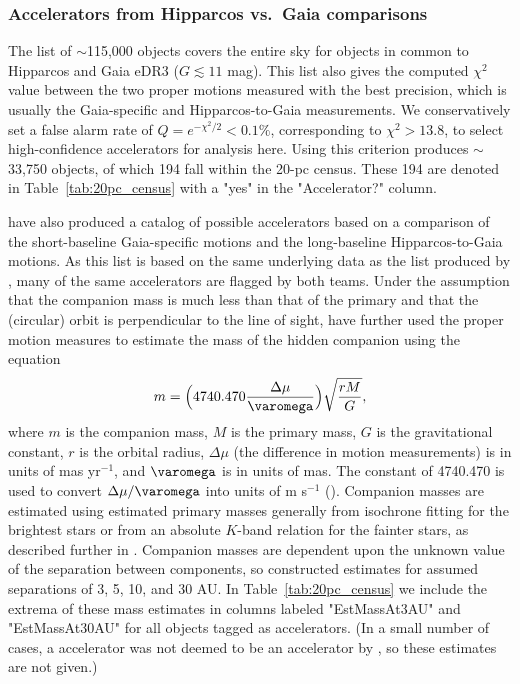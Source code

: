 \documentclass[twocolumn,tighten,twocolappendix]{aastex631}
\begin{document}
\subsubsection{Accelerators from Hipparcos vs.\ Gaia comparisons}

The \cite{brandt2021} list of $\sim$115,000 objects covers the entire sky for objects in common to Hipparcos and Gaia eDR3 ($G \lesssim 11$ mag). This list also gives the computed $\chi^2$ value between the two proper motions measured with the best precision, which is usually the Gaia-specific and Hipparcos-to-Gaia measurements. We conservatively set a false alarm rate of $Q = e^{-\chi^2/2} < 0.1\%$, corresponding to $\chi^2 > 13.8$, to select high-confidence accelerators for analysis here. Using this criterion produces $\sim$33,750 objects, of which 194 fall within the 20-pc census. These 194 are denoted in Table~\ref{tab:20pc_census} with a "yes" in the "Accelerator?" column.

\cite{kervella2022} have also produced a catalog of possible accelerators based on a comparison of the short-baseline Gaia-specific motions and the long-baseline Hipparcos-to-Gaia motions. As this list is based on the same underlying data as the list produced by \cite{brandt2021}, many of the same accelerators are flagged by both teams. Under the assumption that the companion mass is much less than that of the primary and that the (circular) orbit is perpendicular to the line of sight, \cite{kervella2022} have further used the proper motion measures to estimate the mass of the hidden companion using the equation
\begin{equation}
    m =  \Bigl(4740.470\frac{\Delta\mu}{\varomega}\Bigr)\sqrt{\frac{rM}{G}},
    \label{eqn:kervella}
\end{equation} 
where $m$ is the companion mass, $M$ is the primary mass, $G$ is the gravitational constant, $r$ is the orbital radius, $\Delta\mu$ (the difference in motion measurements) is in units of mas yr$^{-1}$, and $\varomega$ is in units of mas. The constant of 4740.470 is used to convert $\Delta\mu/\varomega$ into units of m s$^{-1}$ (\citealt{kervella2019}). Companion masses are estimated using estimated primary masses generally from isochrone fitting for the brightest stars or from an absolute $K$-band relation for the fainter stars, as described further in \cite{kervella2022}. Companion masses are dependent upon the unknown value of the separation between components, so \cite{kervella2022} constructed estimates for assumed separations of 3, 5, 10, and 30 AU. In Table~\ref{tab:20pc_census} we include the extrema of these mass estimates in columns labeled "EstMassAt3AU" and "EstMassAt30AU" for all objects tagged as accelerators. (In a small number of cases, a \citealt{brandt2021} accelerator was not deemed to be an accelerator by \citealt{kervella2022}, so these estimates are not given.)
\end{document}
